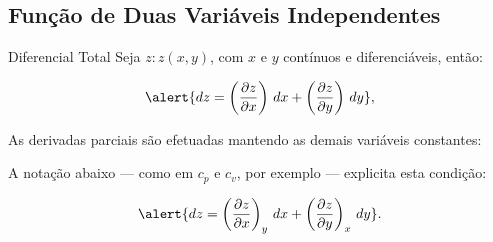 \subsection{Função de Duas Variáveis Independentes}

    \begin{frame}{Diferencial Total}\vspace*{-1em}
        Seja \alert{$z\!:\!z(x, y)$}, com \alert{$x$} e \alert{$y$} contínuos e diferenciáveis,
        então:

        \begin{equation*}
            \alert{dz =
                \left(
                    \frac{\partial z}{\partial x}
                \right)\,dx +
                \left(
                    \frac{\partial z}{\partial y}
                \right)\,dy},
        \end{equation*}\vspace*{\medskipamount}

        As derivadas parciais são efetuadas mantendo as \alert{demais variáveis constantes}:

        A notação abaixo --- como em \alert{$c_p$} e \alert{$c_v$}, por exemplo ---
        \alert{explicita} esta condição:

        \begin{equation*}
            \alert{dz =
                \left(
                    \frac{\partial z}{\partial x}
                \right)_y\,dx +
                \left(
                    \frac{\partial z}{\partial y}
                \right)_x\,dy}.
        \end{equation*}
    \end{frame}

